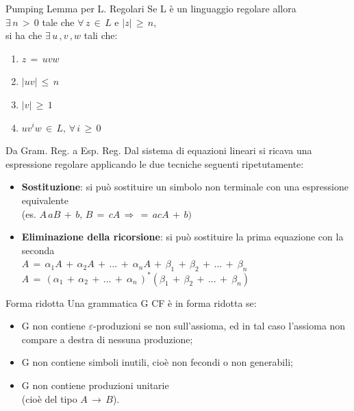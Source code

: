 \documentclass[10pt,a4paper]{article}
\begin{document}
\begin{multicols}{3}
\begin{textbox}{Pumping Lemma per L. Regolari}
Se L è un linguaggio regolare allora \\
\(\exists \, n \, > \, 0\) tale che \(\forall \, z \, \in \, L \) e
\(|z| \, \geq \, n\),\\si ha che
\(\exists \, u \, ,v \, ,w\) tali che:
\begin{enumerate}[leftmargin=*]
    \item \(z\, =\, uvw\)
    \item \(|uv|\, \leq\,  n\)
    \item \(|v|\, \geq\,  1\)
    \item \(uv^iw\,\in\,L,\,\forall\,i\,\geq\,0\)
\end{enumerate}

\end{textbox}

\begin{textbox}{Da Gram. Reg. a Esp. Reg.}
Dal sistema di equazioni lineari si ricava una espressione regolare
applicando le due tecniche seguenti ripetutamente:
\begin{itemize}[leftmargin=*]
    \item \textbf{Sostituzione}: si può sostituire un simbolo non terminale con una espressione equivalente \\
    (es. \(A\, aB\, +\, b,\, B\, =\, cA\,\Rightarrow \,  =\, acA\, +\, b)\)
    \item \textbf{Eliminazione della ricorsione}: si può sostituire la prima equazione con la seconda\\
    \(A\,=\,\alpha_1A\,+\,\alpha_2A\,+\,...\,+\
    \alpha_nA\,+\,\beta_1\,+\,\beta_2\,+\,...\,+\
    \beta_n\) \\
    \(A\,=\,(\alpha_1\,+\,\alpha_2\,+\,...\,+\
    \alpha_n\,)^\ast(\beta_1\,+\,\beta_2\,+\,...\,+\
    \beta_n)\)
\end{itemize}

\end{textbox}

\begin{textbox}{Forma ridotta}
Una grammatica G CF è in forma ridotta se:
\begin{itemize}[leftmargin=*]
    \item G non contiene \(\varepsilon\)-produzioni
    se non sull’assioma, ed in tal caso l’assioma non
    compare a destra di nessuna produzione;
    \item G non contiene simboli inutili, cioè non fecondi o non generabili;
    \item G non contiene produzioni unitarie\\(cioè del tipo \(A\,\rightarrow\,B\)).
\end{itemize}


\end{textbox}
\end{multicols}
\end{document}
